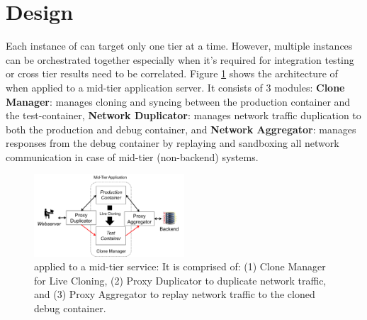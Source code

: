 
\section{Design}
\label{sec:design}
Each instance of \parikshan can target only one tier at a time.
However, multiple instances can be orchestrated together especially when it's required for integration testing or cross tier results need to be correlated.
Figure \ref{fig:workflow} shows the architecture of \parikshan when applied to a mid-tier application server.
It consists of 3 modules: 
\textbf{Clone Manager}: manages cloning and syncing between the production container and the test-container, 
\textbf{Network Duplicator}: manages network traffic duplication  to both the production and debug container, 
and \textbf{Network Aggregator}: manages responses from the debug container by replaying and sandboxing all network communication in case of mid-tier (non-backend) systems.


\begin{figure}[h]
  \begin{center}
    \includegraphics[width=0.5\textwidth]{figs/arch.png}
    \caption{\parikshan applied to a mid-tier service: It is comprised of: (1) Clone Manager for Live Cloning, (2) Proxy Duplicator to duplicate network traffic, and (3) Proxy Aggregator to replay network traffic to the cloned debug container.}
    \label{fig:workflow}
  \end{center}
\end{figure}



